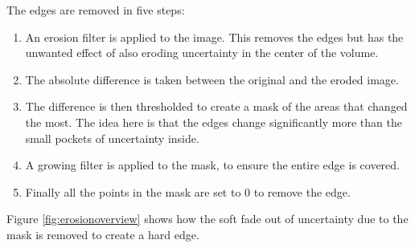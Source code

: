 The edges are removed in five steps:

\begin{enumerate}
  \item An erosion filter is applied to the image. This removes the edges but has the unwanted effect of also eroding uncertainty in the center of the volume.
  \item The absolute difference is taken between the original and the eroded image.
  \item The difference is then thresholded to create a mask of the areas that changed the most. The idea here is that the edges change significantly more than the small pockets of uncertainty inside.
  \item A growing filter is applied to the mask, to ensure the entire edge is covered.
  \item Finally all the points in the mask are set to 0 to remove the edge.
\end{enumerate}

Figure \ref{fig:erosionoverview} shows how the soft fade out of uncertainty due to the mask is removed to create a hard edge.


